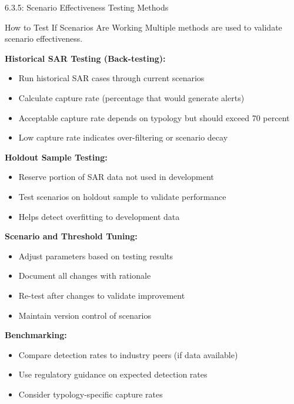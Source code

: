 \documentclass[11pt,a4paper]{beamer}
\begin{document}
\begin{frame}{6.3.5: Scenario Effectiveness Testing Methods}
	\begin{block}{How to Test If Scenarios Are Working}
		Multiple methods are used to validate scenario effectiveness.
	\end{block}
	\textbf{Historical SAR Testing (Back-testing):}
	\begin{itemize}
		\item Run historical SAR cases through current scenarios
		\item Calculate capture rate (percentage that would generate alerts)
		\item Acceptable capture rate depends on typology but should exceed 70 percent
		\item Low capture rate indicates over-filtering or scenario decay
	\end{itemize}
	\textbf{Holdout Sample Testing:}
	\begin{itemize}
		\item Reserve portion of SAR data not used in development
		\item Test scenarios on holdout sample to validate performance
		\item Helps detect overfitting to development data
	\end{itemize}
	\textbf{Scenario and Threshold Tuning:}
	\begin{itemize}
		\item Adjust parameters based on testing results
		\item Document all changes with rationale
		\item Re-test after changes to validate improvement
		\item Maintain version control of scenarios
	\end{itemize}
	\textbf{Benchmarking:}
	\begin{itemize}
		\item Compare detection rates to industry peers (if data available)
		\item Use regulatory guidance on expected detection rates
		\item Consider typology-specific capture rates
	\end{itemize}
\end{frame}

\end{document}
